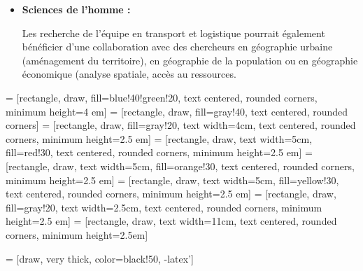\begin{itemize}
	    \item \textbf{Sciences de l'homme : }
	    
	    
	    Les recherche de l'équipe en transport et logistique pourrait également bénéficier d'une collaboration avec des chercheurs en géographie urbaine (aménagement du territoire), en géographie de la population ou en géographie économique (analyse spatiale, accès au ressources.

	    
	\end{itemize}
	
		
		
 = [rectangle, draw, fill=blue!40!green!20, text centered, rounded corners, minimum height=4 em]		
 = [rectangle, draw, fill=gray!40, text centered, rounded corners]		
 = [rectangle, draw, fill=gray!20, text width=4cm, text centered, rounded corners, minimum height=2.5 em]
 = [rectangle, draw, text width=5cm, fill=red!30,  text centered, rounded corners, minimum height=2.5 em]
 = [rectangle, draw, text width=5cm, fill=orange!30, text centered, rounded corners, minimum height=2.5 em]
 = [rectangle, draw, text width=5cm, fill=yellow!30, text centered, rounded corners, minimum height=2.5 em]
 = [rectangle, draw, fill=gray!20, text width=2.5cm, text centered, rounded corners, minimum height=2.5 em]
 = [rectangle, draw, text width=11cm, text centered, rounded corners, minimum height=2.5em]

 = [draw, very thick, color=black!50, -latex']

